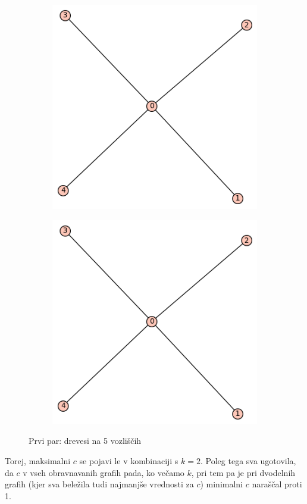 \documentclass[12pt, a4paper]{article}
\begin{document}
\begin{center}
\begin{figure}[!htb]
\centering
\begin{subfigure}{0.5\textwidth}
  \centering
  \includegraphics[width=0.4\linewidth]{t-7}
\end{subfigure}%
\begin{subfigure}{0.5\textwidth}
  \centering
  \includegraphics[width=0.4\linewidth]{t-7}
\end{subfigure}
\caption{Prvi par: drevesi na 5 vozliščih}
\label{fig:test}
\end{figure}
\end{center}
Torej, maksimalni $c$ se pojavi le v kombinaciji s $k=2$. Poleg tega sva ugotovila, da $c$ v vseh obravnavanih grafih pada, ko večamo $k$, pri tem pa je pri dvodelnih grafih (kjer sva beležila tudi najmanjše vrednosti za $c$) minimalni $c$ naraščal proti 1.
\end{document}
